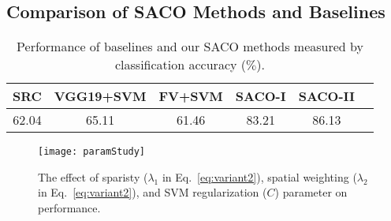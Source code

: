 \documentclass[10pt,twocolumn,letterpaper]{article}
\def\ie{\emph{i.e. }}
\begin{document}
%
%
%

\subsection{Comparison of SACO Methods and Baselines}
\label{ssec:twoVariants}

\begin{table}[t]
\small
  \centering
  \begin{tabular}{ | c| c| c | c|  c|  c| }
     \hline
        SRC & VGG19+SVM & FV+SVM & SACO-I & SACO-II \\
     \hline
     62.04 & 65.11 & 61.46 & 83.21 & 86.13 \\
     \hline
   \end{tabular}
\caption{Performance of baselines and our SACO methods measured by classification accuracy ($\%$).}
\label{tab:twoVariants}
\vspace{-3mm}
\end{table}



\begin{figure*}[ht!]
\centering
   \texttt{[image: paramStudy]}
\vspace{-1mm}
   \caption{The effect of sparisty
   ($\lambda_1$ in Eq.~\ref{eq:variant2}),
   spatial weighting ($\lambda_2$ in Eq.~\ref{eq:variant2}),
   and SVM regularization ($C$) parameter on performance.  }
\label{fig:paramStudy}
\vspace{-3mm}
\end{figure*}
\end{document}
